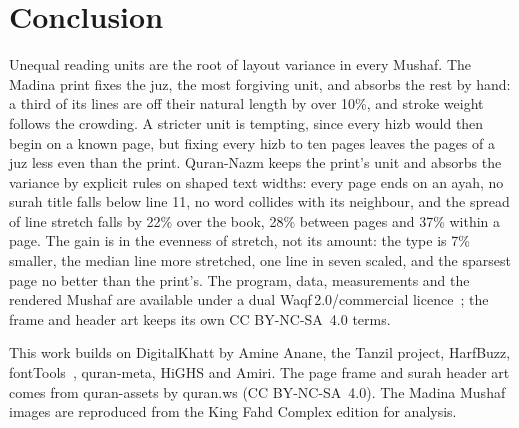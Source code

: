 \documentclass[sigconf,nonacm]{acmart}
\begin{document}
\section{Conclusion}
Unequal reading units are the root of layout variance in every Mushaf. The Madina print fixes the juz, the most forgiving unit, and absorbs the rest by hand: a third of its lines are off their natural length by over 10\%, and stroke weight follows the crowding. A stricter unit is tempting, since every hizb would then begin on a known page, but fixing every hizb to ten pages leaves the pages of a juz less even than the print. Quran-Nazm keeps the print's unit and absorbs the variance by explicit rules on shaped text widths: every page ends on an ayah, no surah title falls below line 11, no word collides with its neighbour, and the spread of line stretch falls by 22\% over the book, 28\% between pages and 37\% within a page. The gain is in the evenness of stretch, not its amount: the type is 7\% smaller, the median line more stretched, one line in seven scaled, and the sparsest page no better than the print's. The program, data, measurements and the rendered Mushaf are available under a dual Waqf\,2.0/commercial licence~\cite{nazm}; the frame and header art keeps its own CC BY-NC-SA~4.0 terms.

\begin{acks}
This work builds on DigitalKhatt by Amine Anane, the Tanzil project, HarfBuzz, fontTools~\cite{fonttools}, quran-meta, HiGHS and Amiri. The page frame and surah header art comes from quran-assets by quran.ws (CC BY-NC-SA~4.0). The Madina Mushaf images are reproduced from the King Fahd Complex edition for analysis.
\end{acks}



\end{document}
